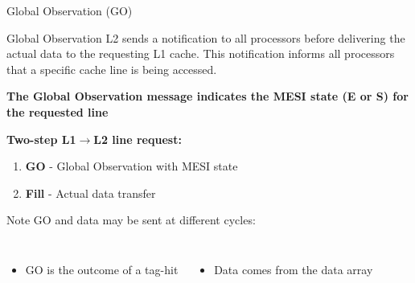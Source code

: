 \documentclass[aspectratio=169,12pt]{beamer}
\begin{document}
\begin{frame}{Global Observation (GO)}
\begin{block}{Global Observation}
L2 sends a notification to all processors before delivering the actual data to the requesting L1 cache. This notification informs all processors that a specific cache line is being accessed.
\end{block}

\textbf{The Global Observation message indicates the MESI state (E or S) for the requested line}

\vspace{0.2em}
\textbf{Two-step L1$\rightarrow$L2 line request:}
\begin{enumerate}
\item \textbf{GO} - Global Observation with MESI state
\item \textbf{Fill} - Actual data transfer
\end{enumerate}

\vspace{0.2em}
\begin{alertblock}{Note}
GO and data may be sent at different cycles:
\vspace{-0.3em}
\begin{columns}
\begin{itemize}
\item GO is the outcome of a tag-hit
\end{itemize}
\begin{itemize}
\item Data comes from the data array
\end{itemize}
\end{columns}
\end{alertblock}
\end{frame}
\end{document}
